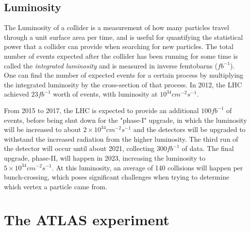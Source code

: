 \documentclass[10pt]{ucscthesisbs}
\begin{document}
\subsection{Luminosity}
The Luminosity of a collider is a measurement of how many particles travel through a unit surface area per time, and is useful for quantifying the statistical power that a collider can provide when searching for new particles. The total number of events expected after the collider has been running for some time is called the \textit{integrated luminosity} and is measured in inverse femtobarns ($fb^{-1}$). One can find the number of expected events for a certain process by multiplying the integrated luminosity by the cross-section of that process. In 2012, the LHC achieved $23 fb^{-1}$ worth of events, with luminosity at $10^{34}cm^{-2}s^{-1}$.\cite{LHC2008} \par
From 2015 to 2017, the LHC is expected to provide an additional $100 fb^{-1}$ of events, before being shut down for the "phase-I" upgrade, in which the luminosity will be increased to about $2\times 10^{34}cm^{-2}s^{-1}$ and the detectors will be upgraded to withstand the increased radiation from the higher luminosity. \cite{atlasupgrade} The third run of the detector will occur until about 2021, collecting $300 fb^{-1}$ of data. The final upgrade, phase-II, will happen in 2023, increasing the luminosity to $5\times 10^{34}cm^{-2}s^{-1}$. At this luminosity, an average of 140 collisions will happen per bunch-crossing, which poses significant challenges when trying to determine which vertex a particle came from. \cite{atlasupgrade}
\section{The ATLAS experiment}
\end{document}

